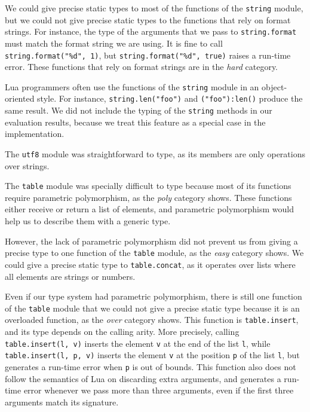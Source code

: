 We could give precise static types to most of the functions of the
\texttt{string} module, but we could not give precise static types
to the functions that rely on format strings.
For instance, the type of the arguments that we pass to
\texttt{string.format} must match the format string we are using.
It is fine to call \texttt{string.format("\%d", 1)}, but
\texttt{string.format("\%d", true)} raises a run-time error.
These functions that rely on format strings are in the \emph{hard} category.

Lua programmers often use the functions of the \texttt{string} module
in an object-oriented style.
For instance, \texttt{string.len("foo")} and \texttt{("foo"):len()}
produce the same result.
We did not include the typing of the \texttt{string} methods in our
evaluation results, because we treat this feature as a special case
in the implementation.

The \texttt{utf8} module was straightforward to type,
as its members are only operations over strings.

The \texttt{table} module was specially difficult to type because
most of its functions require parametric polymorphism,
as the \emph{poly} category shows.
These functions either receive or return a list of elements, and
parametric polymorphism would help us to describe them with a generic type.

However, the lack of parametric polymorphism did not prevent us from
giving a precise type to one function of the \texttt{table} module,
as the \emph{easy} category shows.
We could give a precise static type to \texttt{table.concat},
as it operates over lists where all elements are strings or numbers.

Even if our type system had parametric polymorphism, there is
still one function of the \texttt{table} module that we could
not give a precise static type because it is an overloaded function,
as the \emph{over} category shows.
This function is \texttt{table.insert}, and its type depends on
the calling arity.
More precisely, calling \texttt{table.insert(l, v)} inserts the
element \texttt{v} at the end of the list \texttt{l},
while \texttt{table.insert(l, p, v)} inserts the element \texttt{v}
at the position \texttt{p} of the list \texttt{l},
but generates a run-time error when \texttt{p} is out of bounds.
This function also does not follow the semantics of Lua on
discarding extra arguments, and generates a run-time error whenever
we pass more than three arguments, even if the first three arguments
match its signature.

